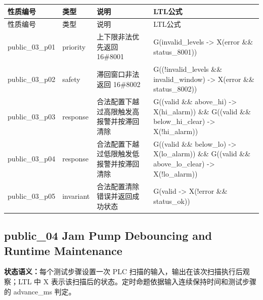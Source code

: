 \begin{longtable}{L{2.3cm}L{1.7cm}L{4.1cm}L{5.2cm}}

\toprule

性质编号 & 类型 & 说明 & LTL公式\\

\midrule

\endfirsthead

\toprule

性质编号 & 类型 & 说明 & LTL公式\\

\midrule

\endhead

{\ttfamily public\_03\_p01} & priority & 上下限非法优先返回 16\#8001 & {\ttfamily G(invalid\_levels -> X(error \&\& status\_8001))}\\

{\ttfamily public\_03\_p02} & safety & 滞回窗口非法返回 16\#8002 & {\ttfamily G((!invalid\_levels \&\& invalid\_window) -> X(error \&\& status\_8002))}\\

{\ttfamily public\_03\_p03} & response & 合法配置下越过高限触发高报警并按滞回清除 & {\ttfamily G((valid \&\& above\_hi) -> X(hi\_alarm)) \&\& G((valid \&\& below\_hi\_clear) -> X(!hi\_alarm))}\\

{\ttfamily public\_03\_p04} & response & 合法配置下越过低限触发低报警并按滞回清除 & {\ttfamily G((valid \&\& below\_lo) -> X(lo\_alarm)) \&\& G((valid \&\& above\_lo\_clear) -> X(!lo\_alarm))}\\

{\ttfamily public\_03\_p05} & invariant & 合法配置清除错误并返回成功状态 & {\ttfamily G(valid -> X(!error \&\& status\_ok))}\\

\bottomrule

\end{longtable}

\subsection{{\ttfamily public\_04} Jam Pump Debouncing and Runtime Maintenance}

\noindent\textbf{状态语义：}每个测试步骤设置一次 PLC 扫描的输入，输出在该次扫描执行后观察；LTL 中 X 表示该扫描后的状态。定时命题依据输入连续保持时间和测试步骤的 advance\_ms 判定。


